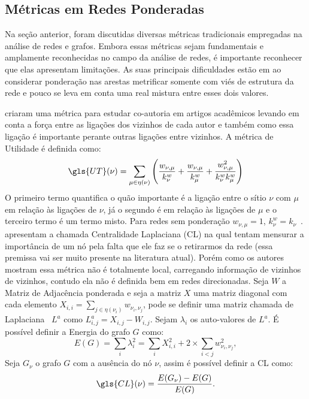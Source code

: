 \subsection{Métricas em Redes Ponderadas}

Na seção anterior, foram discutidas diversas métricas tradicionais empregadas na análise de redes e grafos. Embora essas métricas sejam fundamentais e amplamente reconhecidas no campo da análise de redes, é importante reconhecer que elas apresentam limitações. As suas principais dificuldades estão em ao considerar ponderação nas arestas metrificar somente com viés de estrutura da rede e pouco se leva em conta uma real mistura entre esses dois valores. 

 criaram uma métrica para estudar co-autoria em artigos acadêmicos levando em conta a força entre as ligações dos vizinhos de cada autor e também como essa ligação é importante perante outras ligações entre vizinhos. A 
métrica de Utilidade é definida como:
\begin{equation}
  \gls{UT}(\nu) = \sum_{\substack{\mu \in \eta(\nu)}} \left(\frac{w_{\nu,\mu}}{k^w_\nu}+ \frac{w_{\nu,\mu}}{k^w_\mu} + \frac{w_{\nu,\mu}^2}{k^w_\nu k^w_\mu}\right)
\end{equation}
O primeiro termo quantifica o quão importante é a ligação entre o sítio $\nu$ com $\mu$ em relação às ligações de $\nu$, já o segundo é em relação às ligações de $\mu$ e o terceiro termo é um termo misto. Para redes sem ponderação $w_{\nu,\mu} = 1$, $k_\nu^w = k_\nu$~\cite{Jackson1996}.
\cite{Qi2012} apresentam a chamada Centralidade Laplaciana (\gls{CL}) na qual tentam mensurar a importância de um nó pela falta que ele faz se o retirarmos da rede (essa premissa vai ser muito presente na literatura atual). Porém como os autores mostram essa métrica não é totalmente local, carregando informação de vizinhos de vizinhos, contudo ela não é definida bem em redes direcionadas.
Seja $W$ a Matriz de Adjacência ponderada e seja a matriz $X$ uma matriz diagonal com cada elemento $X_{i,i} = \sum_{j \in \eta(\nu_i)}w_{\nu_i,\nu_j}$, pode se definir uma matriz chamada de Laplaciana~\cite{networks} $L^a$ como $L^a_{i,j} = X_{i,j} - W_{i,j}$. Sejam
${\lambda_{i}}$ os auto-valores de $L^a$. É possível definir a Energia do grafo $G$ como:
\begin{equation}
    E(G) = \sum_{i} \lambda_{i}^2 = \sum_{i}X_{i,i}^2 + 2\times\sum_{i < j}w_{\nu_i,\nu_j}^2,
\end{equation}
Seja $G_\nu$ o grafo $G$ com a ausência do nó $\nu$, assim é possível definir a \gls{CL} como:
\begin{equation}
  \gls{CL}(\nu) = \frac{E(G_\nu) - E(G)}{E(G)}.
\end{equation}

